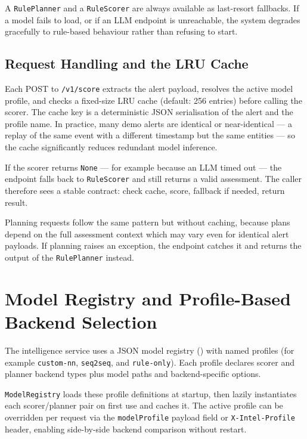 A \texttt{RulePlanner} and a \texttt{RuleScorer} are always available as last-resort fallbacks. If a model fails to load, or if an LLM endpoint is unreachable, the system degrades gracefully to rule-based behaviour rather than refusing to start.

\subsection{Request Handling and the LRU Cache}

Each POST to \texttt{/v1/score} extracts the alert payload, resolves the active model profile, and checks a fixed-size LRU cache (default: 256 entries) before calling the scorer. The cache key is a deterministic JSON serialisation of the alert and the profile name. In practice, many demo alerts are identical or near-identical --- a replay of the same event with a different timestamp but the same entities --- so the cache significantly reduces redundant model inference.

If the scorer returns \texttt{None} --- for example because an LLM timed out --- the endpoint falls back to \texttt{RuleScorer} and still returns a valid assessment. The caller therefore sees a stable contract: check cache, score, fallback if needed, return result.

Planning requests follow the same pattern but without caching, because plans depend on the full assessment context which may vary even for identical alert payloads. If planning raises an exception, the endpoint catches it and returns the output of the \texttt{RulePlanner} instead.

\section{Model Registry and Profile-Based Backend Selection}
\label{sec:impl-registry}

The intelligence service uses a JSON model registry ()
with named profiles (for example \texttt{custom-nn}, \texttt{seq2seq}, and
\texttt{rule-only}). Each profile declares scorer and planner backend types plus
model paths and backend-specific options.

\texttt{ModelRegistry} loads these profile definitions at startup, then lazily instantiates each scorer/planner pair on first use and caches it. The active profile can be overridden per request via the \texttt{modelProfile} payload field or \texttt{X-Intel-Profile} header, enabling side-by-side backend comparison without restart.

